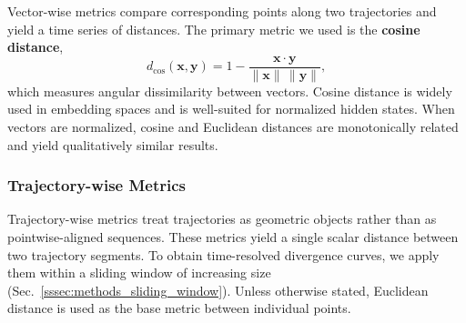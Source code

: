 \documentclass[aip%
 aip,
 amsmath,amssymb,
 reprint,%
]{revtex4-1}
\begin{document}
Vector-wise metrics compare corresponding points along two trajectories and yield a time series of distances. The primary metric we used is the \textbf{cosine distance},
\begin{equation}
d_{\mathrm{cos}}(\mathbf{x},\mathbf{y})
=
1 - \frac{\mathbf{x}\cdot\mathbf{y}}{\|\mathbf{x}\|\,\|\mathbf{y}\|},
\end{equation}
which measures angular dissimilarity between vectors. Cosine distance is widely used in embedding spaces and is well-suited for normalized hidden states. When vectors are normalized, cosine and Euclidean distances are monotonically related and yield qualitatively similar results.

\subsubsection{Trajectory-wise Metrics}
\label{sssec:methods_trajectory_metrics}

Trajectory-wise metrics treat trajectories as geometric objects rather than as pointwise-aligned sequences. These metrics yield a single scalar distance between two trajectory segments. To obtain time-resolved divergence curves, we apply them within a sliding window of increasing size (Sec.~\ref{sssec:methods_sliding_window}). Unless otherwise stated, Euclidean distance is used as the base metric between individual points.
\end{document}
